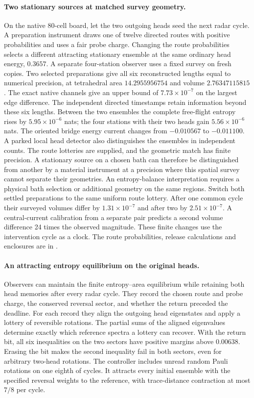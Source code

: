 \documentclass[11pt]{article}
\begin{document}
\paragraph{Two stationary sources at matched survey geometry.}
On the native 80-cell board, let the two outgoing heads seed the next
radar cycle. A preparation instrument draws one of twelve directed
routes with positive probabilities and uses a fair probe charge.
Changing the route probabilities selects a different attracting
stationary ensemble at the same ordinary head energy, $0.3657$.
A separate four-station observer uses a fixed survey on fresh copies.
Two selected preparations give all six reconstructed lengths equal
to numerical precision, at tetrahedral area $14.2955956754$ and
volume $2.76347115815$. The exact native channels give an upper
bound of $7.73\times10^{-7}$ on the largest edge difference.
The independent directed timestamps retain
information beyond these six lengths. Between the two ensembles the
complete free-flight entropy rises by $5.95\times10^{-6}$ nats;
the four stations with their two heads gain $5.56\times10^{-6}$ nats.
The oriented bridge energy current changes from $-0.010567$ to
$-0.011100$. A parked local head detector also distinguishes the
ensembles in independent counts. The route lotteries are supplied,
and the geometric match has finite precision. A stationary source on
a chosen bath can therefore be distinguished from another by a
material instrument at a precision where this spatial survey cannot
separate their geometries. An entropy-balance interpretation requires
a physical bath selection or additional geometry on the same regions.
Switch both settled preparations to the same uniform route lottery.
After one common cycle their surveyed volumes differ by
$1.31\times10^{-7}$ and after two by $2.51\times10^{-7}$.
A central-current calibration from a separate pair predicts a second
volume difference 24 times the observed magnitude. These finite
changes use the intervention cycle as a clock. The route probabilities,
release calculations and enclosures are in
.

\paragraph{An attracting entropy equilibrium on the original heads.}
Observers can maintain the finite entropy--area equilibrium while
retaining both head memories after every radar cycle. They record
the chosen route and probe charge, the conserved reversal sector,
and whether the return preceded the deadline. For each record they
align the outgoing head eigenstates and apply a lottery of reversible
rotations. The partial sums of the aligned eigenvalues determine exactly
which reference spectra a lottery can recover. With the return bit, all
six inequalities on the two sectors have positive margins above
$0.00638$. Erasing the bit makes the second inequality fail in both
sectors, even for arbitrary two-head rotations. The controller includes
unread random Pauli rotations on one eighth of cycles. It attracts every
initial ensemble with the specified reversal weights to the reference,
with trace-distance contraction at most $7/8$ per cycle.
\end{document}
